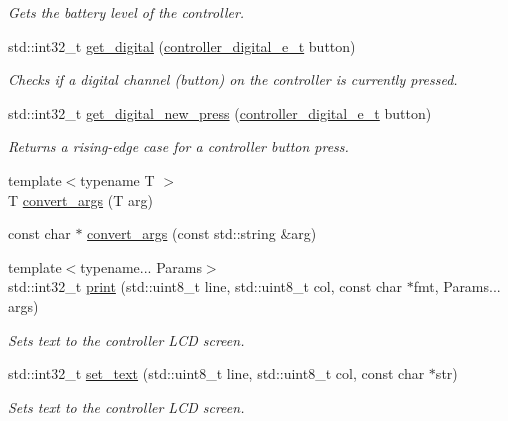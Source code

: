 \begin{DoxyCompactItemize}
\begin{DoxyCompactList}\small\item\em Gets the battery level of the controller. \end{DoxyCompactList}\item 
std\+::int32\+\_\+t \hyperlink{classpros_1_1Controller_aec180b0f1700915007de2b7855070c80}{get\+\_\+digital} (\hyperlink{misc_8h_a8c380ff02828ee53954bc0ce274253ed}{controller\+\_\+digital\+\_\+e\+\_\+t} button)
\begin{DoxyCompactList}\small\item\em Checks if a digital channel (button) on the controller is currently pressed. \end{DoxyCompactList}\item 
std\+::int32\+\_\+t \hyperlink{classpros_1_1Controller_a9dc7dc6028431d3f8f9aff0fc7a4bed6}{get\+\_\+digital\+\_\+new\+\_\+press} (\hyperlink{misc_8h_a8c380ff02828ee53954bc0ce274253ed}{controller\+\_\+digital\+\_\+e\+\_\+t} button)
\begin{DoxyCompactList}\small\item\em Returns a rising-\/edge case for a controller button press. \end{DoxyCompactList}\item 
{\footnotesize template$<$typename T $>$ }\\T \hyperlink{classpros_1_1Controller_ae0a289e9e55e8f861591af1a6407a0f8}{convert\+\_\+args} (T arg)
\item 
const char $\ast$ \hyperlink{classpros_1_1Controller_a80ab1bf077cfe15fa9b7c4cba27428ef}{convert\+\_\+args} (const std\+::string \&arg)
\item 
{\footnotesize template$<$typename... Params$>$ }\\std\+::int32\+\_\+t \hyperlink{classpros_1_1Controller_a4a301df3d34578661271f9b400da1176}{print} (std\+::uint8\+\_\+t line, std\+::uint8\+\_\+t col, const char $\ast$fmt, Params... args)
\begin{DoxyCompactList}\small\item\em Sets text to the controller L\+CD screen. \end{DoxyCompactList}\item 
std\+::int32\+\_\+t \hyperlink{classpros_1_1Controller_a2ec84a072d09a4bb39253956662604cd}{set\+\_\+text} (std\+::uint8\+\_\+t line, std\+::uint8\+\_\+t col, const char $\ast$str)
\begin{DoxyCompactList}\small\item\em Sets text to the controller L\+CD screen. \end{DoxyCompactList}\item 

\end{DoxyCompactItemize}
